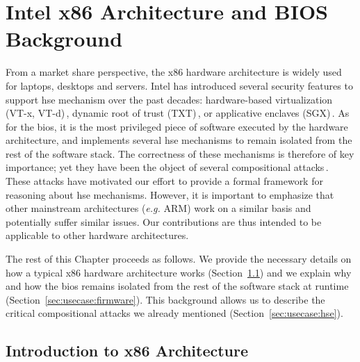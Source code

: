 \chapter{Intel x86 Architecture and BIOS Background}
\label{chapter:usecase}


\vspace{1cm}%
\noindent
%
From a market share perspective, the x86 hardware architecture is widely used
for laptops, desktops and servers.
%
Intel has introduced several security features to support \ac{hse} mechanism
over the past decades: hardware-based virtualization (VT-x, VT-d)\,\cite[Volume
  3, Chapter 23]{intel2014manual}, dynamic root of trust
(TXT)\,\cite{intel2015txt}, or applicative enclaves (SGX)\,\cite[Volume 3,
  Chapter 36]{intel2014manual}\cite{costan2016sgxexplained}.
%
As for the \ac{bios}, it is the most privileged piece of software executed by
the hardware architecture, and implements several \ac{hse} mechanisms to remain
isolated from the rest of the software stack.
%
The correctness of these mechanisms is therefore of key importance; yet they
have been the object of several compositional
attacks\,\cite{duflot2009smram,wojtczuk2009smram,domas2015sinkhole,kallenberg2015racecondition,kovah2015senter}.
%
These attacks have motivated our effort to provide a formal framework for
reasoning about \ac{hse} mechanisms.
%
However, it is important to emphasize that other mainstream architectures
(\emph{e.g.}  ARM) work on a similar basis and potentially suffer similar issues. 
Our contributions are thus intended to be applicable to other hardware
architectures.

The rest of this Chapter proceeds as follows.
%
We provide the necessary details on how a typical x86 hardware architecture
works (Section~\ref{sec:usecase:architecture}) and we explain why and how the
\ac{bios} remains isolated from the rest of the software stack at runtime
(Section~\ref{sec:usecase:firmware}).
%
This background allows us to describe the critical compositional attacks we
already mentioned (Section~\ref{sec:usecase:hse}).

\section{Introduction to x86 Architecture}
\label{sec:usecase:architecture}

